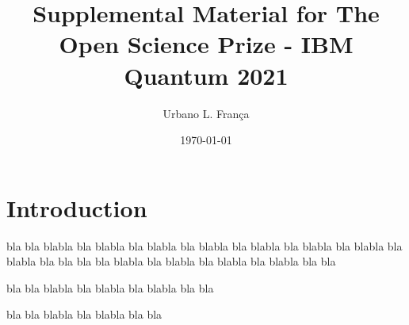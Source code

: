 \documentclass[%
 reprint,
 amsmath,amssymb,
 aps,
rmp,
]{revtex4-1}
\begin{document}

\title{Supplemental Material for The Open Science Prize - IBM Quantum 2021}%

\author{Urbano L. França}


\date{\today}%

\begin{abstract}
\end{abstract}

\maketitle
\section{\label{sec:intro}Introduction}

bla bla blabla bla blabla bla blabla bla blabla bla blabla bla blabla bla blabla bla blabla bla bla
bla bla blabla bla blabla bla blabla bla blabla bla bla

bla bla blabla bla blabla bla blabla bla bla

bla bla blabla bla blabla bla bla

\cite{Alexander20}
\end{document}
